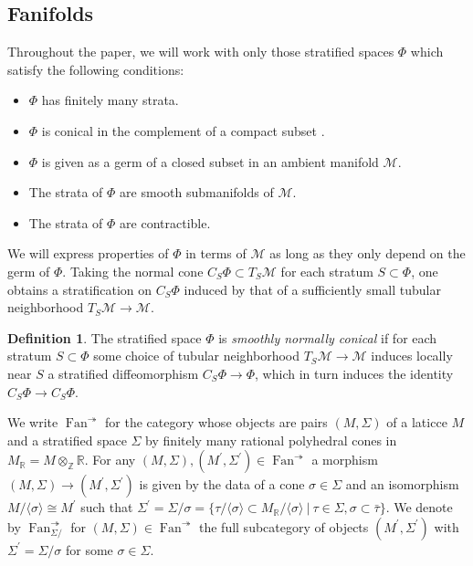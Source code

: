 \documentclass[a4paper,12pt, twoside, pdftex]{amsart}
\theoremstyle{definition}
\newtheorem{definition}[dummy]{Definition}
\numberwithin{equation}{section}
\newcommand{\Fan}{\operatorname{Fan}}
\newcommand{\cM}{\mathcal{M}}
\newcommand{\bR}{\mathbb{R}}
\newcommand{\bZ}{\mathbb{Z}}
\begin{document}
\subsection{Fanifolds}
Throughout the paper,
we will work with only those stratified spaces
$\Phi$
which satisfy the following conditions:

\begin{itemize}
\item[(i)]
$\Phi$
has finitely many strata.
\item[(ii)]
$\Phi$
is conical in the complement of a compact subset
\cite[Page 37]{GS1}. 
\item[(iii)]
$\Phi$
is given as a germ of a closed subset in an ambient manifold
$\cM$.
\item[(iv)]
The strata of
$\Phi$
are smooth submanifolds of
$\cM$.
\item[(v)]
The strata of
$\Phi$
are contractible.
\end{itemize}
We will express properties of
$\Phi$
in terms of
$\cM$
as long as they only depend on the germ of
$\Phi$.
Taking the normal cone
$C_S \Phi \subset T_S \cM$
for each stratum
$S \subset \Phi$,
one obtains a stratification on
$C_S \Phi$
induced by that of a sufficiently small tubular neighborhood
$T_S \cM \to \cM$.

\begin{definition}
The stratified space
$\Phi$
is
\emph{smoothly normally conical}
if for each stratum
$S \subset \Phi$
some choice of tubular neighborhood
$T_S \cM \to \cM$
induces locally near
$S$
a stratified diffeomorphism
$C_S \Phi \to \Phi$,
which in turn induces the identity
$C_S \Phi \to C_S \Phi$.
\end{definition}

We write
$\Fan^\twoheadrightarrow$
for the category whose objects are pairs
$(M, \Sigma)$
of a laticce
$M$
and
a stratified space
$\Sigma$
by finitely many rational polyhedral cones in
$M_\bR = M \otimes_\bZ \bR$.
For any
$(M, \Sigma), (M^\prime, \Sigma^\prime) \in \Fan^\twoheadrightarrow$
a morphism
$(M, \Sigma) \to (M^\prime, \Sigma^\prime)$
is given by
the data of a cone
$\sigma \in \Sigma$
and
an isomorphism
$M / \langle \sigma \rangle \cong M^\prime$
such that
$\Sigma^\prime
=
\Sigma / \sigma
=
\{ \tau / \langle \sigma \rangle \subset M_\bR / \langle \sigma \rangle \  | \ \tau \in \Sigma, \sigma \subset \bar{\tau} \}$.
We denote by
$\Fan^\twoheadrightarrow_{\Sigma /}$
for
$(M, \Sigma) \in \Fan^\twoheadrightarrow$
the full subcategory of objects
$(M^\prime, \Sigma^\prime)$
with
$\Sigma^\prime = \Sigma / \sigma$
for some
$\sigma \in \Sigma$.
\end{document}
